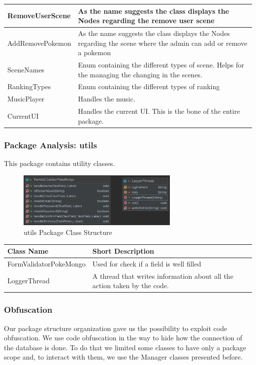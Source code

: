 \begin{center}
\begin{longtable}{| m{14em} | m{19em} |}
		\hline
		RemoveUserScene & As the name suggests the class displays the Nodes regarding the remove user scene\\
		\hline
		AddRemovePokemon & As the name suggests the class displays the Nodes regarding the scene where the admin can add or remove a pokemon\\
		\hline
		SceneNames & Enum containing the different types of scene. Helps for the managing the changing in the scenes.\\
		\hline
		RankingTypes & Enum containing the different types of ranking\\
		\hline
		MusicPlayer & Handles the music.\\
		\hline
		CurrentUI & Handles the current UI. This is the bone of the entire package.\\
		\hline
	\end{longtable}
\end{center}
\subsubsection{Package Analysis: utils}
This package contains utility classes. 
\begin{figure}[H]
	\centering
	\includegraphics[width=0.7\textwidth]{img/utils_package.png}
	\caption{utils Package Class Structure}
\end{figure}
\begin{center}
	\begin{tabular}{| m{14em} | m{19em} |} 
		\hline
		\textbf{Class Name} & \textbf{Short Description} \\ [0.5ex] 
		\hline
		FormValidatorPokeMongo & Used for check if a field is well filled\\ 
		\hline
		LoggerThread & A thread that writes information about all the action taken by the code.\\ 
		\hline
	\end{tabular}
\end{center}

\subsubsection{Obfuscation}
Our package structure organization gave us the possibility to exploit code obfuscation. We use code obfuscation in the way to hide how the connection of the database is done. To do that we limited some classes to have only a package scope and, to interact with them, we use the Manager classes presented before.

